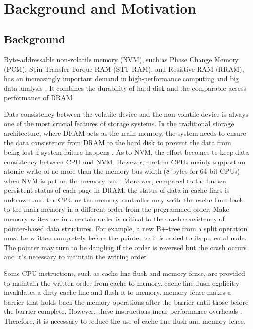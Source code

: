 \section{Background and Motivation}



\subsection{Background}
Byte-addressable non-volatile memory (NVM), such as Phase Change Memory (PCM), Spin-Transfer Torque RAM (STT-RAM), and Resistive RAM (RRAM), has an increasingly important demand in high-performance computing and big data analysis \cite{zhao2013kiln, moraru2013consistent}. It combines the durability of hard disk and the comparable access performance of DRAM. 

Data consistency between the volatile device and the non-volatile device is always one of the most crucial features of storage systems. In the traditional storage architecture, where DRAM acts as the main memory, the system needs to ensure the data consistency from DRAM to the hard disk to prevent the data from being lost if system failure happens \cite{mohan1992aries}. As to NVM, the effort becomes to keep data consistency between CPU and NVM. However, modern CPUs mainly support an atomic write of no more than the memory bus width (8 bytes for 64-bit CPUs) when NVM is put on the memory bus \cite{hwang2018endurable, dulloor2014system, intel64and}. Moreover, compared to the known persistent status of each page in DRAM, the status of data in cache-lines is unknown and the CPU or the memory controller may write the cache-lines back to the main memory in a different order from the programmed order. Make memory writes are in a certain order is critical to the crash consistency of pointer-based data structures. For example, a new B+-tree from a split operation must be written completely before the pointer to it is added to its parental node. The pointer may turn to be dangling if the order is reversed but the crash occurs \cite{yang2015nv} and it's necessary to maintain the writing order. 

Some CPU instructions, such as \textsf{cache line flush} and \textsf{memory fence}, are provided to maintain the written order from cache to memory. \textsf{cache line flush} explicitly invalidates a dirty cache-line and flush it to memory. \textsf{memory fence} makes a barrier that holds back the memory operations after the barrier until those before the barrier complete. However, these instructions incur performance overheads \cite{yang2015nv, hwang2018endurable, lu2014loose}. Therefore, it is necessary to reduce the use of \textsf{cache line flush} and \textsf{memory fence}.
